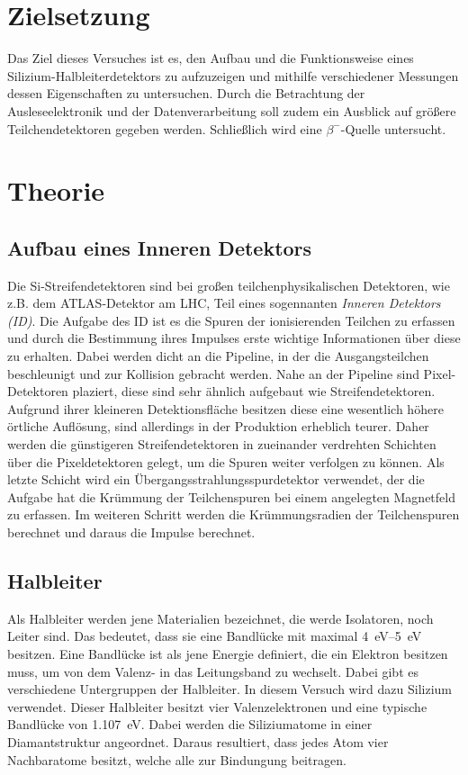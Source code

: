\section{Zielsetzung}
\label{sec:Zielsetzung}

Das Ziel dieses Versuches ist es, den Aufbau und die Funktionsweise eines
Silizium-Halbleiterdetektors zu aufzuzeigen und mithilfe verschiedener Messungen dessen
Eigenschaften zu untersuchen. Durch die Betrachtung der Ausleseelektronik und
der Datenverarbeitung soll zudem ein Ausblick auf größere Teilchendetektoren
gegeben werden. Schließlich wird eine $\beta^{-}$-Quelle untersucht.

\section{Theorie}
\label{sec:Theorie}
\subsection{Aufbau eines Inneren Detektors}

Die Si-Streifendetektoren sind bei großen teilchenphysikalischen Detektoren,
wie z.B. dem ATLAS-Detektor am LHC, Teil eines sogennanten \textit{Inneren Detektors (ID)}.
Die Aufgabe des ID ist es die Spuren der ionisierenden Teilchen zu erfassen und
durch die Bestimmung ihres Impulses erste wichtige Informationen über diese zu
erhalten.
Dabei werden dicht an die Pipeline, in der die Ausgangsteilchen beschleunigt und
zur Kollision gebracht werden. Nahe an der Pipeline sind Pixel-Detektoren plaziert,
diese sind sehr ähnlich aufgebaut wie Streifendetektoren. Aufgrund ihrer kleineren
Detektionsfläche besitzen diese eine wesentlich höhere örtliche Auflösung, sind
allerdings in der Produktion erheblich teurer. Daher werden die günstigeren
Streifendetektoren in zueinander verdrehten Schichten über die Pixeldetektoren
gelegt, um die Spuren weiter verfolgen zu können.
Als letzte Schicht wird ein Übergangsstrahlungsspurdetektor verwendet, der die
Aufgabe hat die Krümmung der Teilchenspuren bei einem angelegten Magnetfeld zu
erfassen. Im weiteren Schritt werden die Krümmungsradien der Teilchenspuren
berechnet und daraus die Impulse berechnet.

\subsection{Halbleiter}
Als Halbleiter werden jene Materialien bezeichnet, die werde Isolatoren, noch Leiter
sind. Das bedeutet, dass sie eine Bandlücke mit maximal \SIrange{4}{5}{\electronvolt}
besitzen. Eine Bandlücke ist
als jene Energie definiert, die ein Elektron besitzen muss, um von dem Valenz-
in das Leitungsband zu wechselt. Dabei gibt es verschiedene
Untergruppen der Halbleiter.
In diesem Versuch wird dazu Silizium verwendet. Dieser Halbleiter besitzt vier
Valenzelektronen und eine typische Bandlücke von \SI{1.107}{\electronvolt}.
 Dabei werden die Siliziumatome in einer Diamantstruktur angeordnet. Daraus
 resultiert, dass jedes Atom vier Nachbaratome besitzt, welche alle zur Bindungung
 beitragen.

